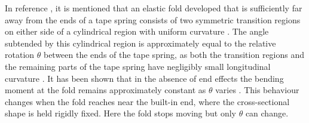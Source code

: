 In reference \cite{Seffen1999}, it is mentioned that an elastic fold developed that is sufficiently far away from the ends of a tape spring consists of two symmetric transition regions on either side of a cylindrical region with uniform curvature \cite{Seffen1999}. The angle subtended by this cylindrical region is approximately equal to the relative rotation $\theta$ between the ends of the tape spring, as both the transition regions and the remaining parts of the tape spring have negligibly small longitudinal curvature \cite{Seffen1999}.
It has been shown that in the absence of end effects the bending moment at the fold remains approximately constant as $\theta$ varies \cite{Seffen1999}. 
This behaviour changes when the fold reaches near the built-in end, where the cross-sectional shape is held rigidly fixed. Here the fold stops moving but only $\theta$ can change. 
